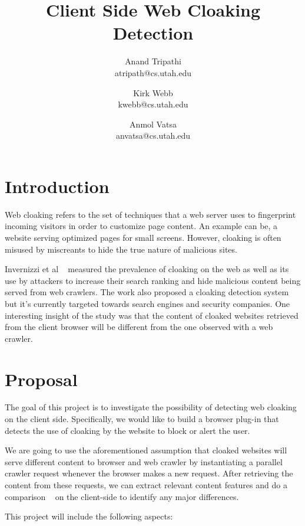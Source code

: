 \documentclass{article}
\title{\vspace{-2.0cm}Client Side Web Cloaking Detection}
\author{
Anand Tripathi\\
       atripath@cs.utah.edu
\and 
Kirk Webb\\
       kwebb@cs.utah.edu
\and
Anmol Vatsa\\
       anvatsa@cs.utah.edu
}
\begin{document}
\maketitle

\section{Introduction}
Web cloaking refers to the set of techniques that a web server uses to fingerprint incoming visitors in order to customize page content. An example can be, a website serving optimized pages for small screens. However, cloaking is often misused by miscreants to hide the true nature of malicious sites.

Invernizzi et al ~\cite{cloak} measured the prevalence of cloaking on the web as well as its use by attackers to increase their search ranking and hide malicious content being served from web crawlers. The work also proposed a cloaking detection system but it's currently targeted towards search engines and security companies. One interesting insight of the study was that the content of cloaked websites retrieved from the client browser will be different from the one observed with a web crawler.

\section{Proposal}
The goal of this project is to investigate the possibility of detecting web cloaking on the client side.  Specifically, we would like to build a browser plug-in that detects the use of cloaking by the website to block or alert the user.

We are going to use the aforementioned assumption that cloaked websites will serve different content to browser and web crawler by instantiating a parallel crawler request whenever the browser makes a new request. After retrieving the content from these requests, we can extract relevant content features and do a comparison ~\cite{cloak} on the client-side to identify any major differences.

This project will include the following aspects:
\end{document}
